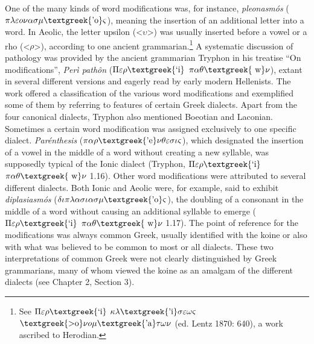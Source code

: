 \begin{styleCatalogusnotities}
One of the many kinds of word modifications was, for instance, \textit{pleonasmós} ($\pi \lambda \varepsilon o\nu \alpha \sigma \mu \text{\textgreek{'o}}\varsigma $), meaning the insertion of an additional letter into a word. In Aeolic, the letter upsilon ({\textless}$\upsilon ${\textgreater}) was usually inserted before a vowel or a rho ({\textless}$\rho ${\textgreater}), according to one ancient grammarian.\footnote{\textrm{ See $\Pi \varepsilon \rho \text{\textgreek{`i}}$ $\kappa \lambda \text{\textgreek{'i}}\sigma \varepsilon \omega \varsigma $ $\text{\textgreek{>o}}\nu o\mu \text{\textgreek{'a}}\tau \omega \nu $ (ed. Lentz 1870: 640), a work ascribed to Herodian.}} A systematic discussion of pathology was provided by the ancient grammarian Tryphon in his treatise “On modifications”, \textit{Perì pathôn} ($\Pi \varepsilon \rho \text{\textgreek{`i}}$ $\pi \alpha \theta \text{\textgreek{~w}}\nu $), extant in several different versions and eagerly read by early modern Hellenists. The work offered a classification of the various word modifications and exemplified some of them by referring to features of certain Greek dialects. Apart from the four canonical dialects, Tryphon also mentioned Boeotian and Laconian. Sometimes a certain word modification was assigned exclusively to one specific dialect. \textit{Parénthesis} ($\pi \alpha \rho \text{\textgreek{'e}}\nu \theta \varepsilon \sigma \iota \varsigma $), which designated the insertion of a vowel in the middle of a word without creating a new syllable, was supposedly typical of the Ionic dialect (Tryphon, $\Pi \varepsilon \rho \text{\textgreek{`i}}$ $\pi \alpha \theta \text{\textgreek{~w}}\nu $ 1.16). Other word modifications were attributed to several different dialects. Both Ionic and Aeolic were, for example, said to exhibit \textit{diplasiasmós} ($\delta \iota \pi \lambda \alpha \sigma \iota \alpha \sigma \mu \text{\textgreek{'o}}\varsigma $), the doubling of a consonant in the middle of a word without causing an additional syllable to emerge ($\Pi \varepsilon \rho \text{\textgreek{`i}}$ $\pi \alpha \theta \text{\textgreek{~w}}\nu $ 1.17). The point of reference for the modifications was always common Greek, usually identified with the koine or also with what was believed to be common to most or all dialects. These two interpretations of common Greek were not clearly distinguished by Greek grammarians, many of whom viewed the koine as an amalgam of the different dialects (see Chapter 2, Section 3).
\end{styleCatalogusnotities}

